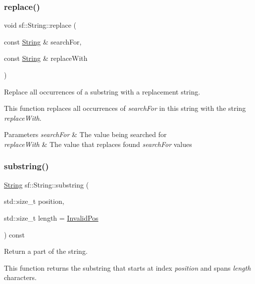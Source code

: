 \subsubsection{\texorpdfstring{replace()}{replace()}\hspace{0.1cm}{\footnotesize\ttfamily [2/2]}}
{\footnotesize\ttfamily void sf\+::\+String\+::replace (\begin{DoxyParamCaption}\item[{const \hyperlink{classsf_1_1_string}{String} \&}]{search\+For,  }\item[{const \hyperlink{classsf_1_1_string}{String} \&}]{replace\+With }\end{DoxyParamCaption})}



Replace all occurrences of a substring with a replacement string. 

This function replaces all occurrences of {\itshape search\+For} in this string with the string {\itshape replace\+With}.


\begin{DoxyParams}{Parameters}
{\em search\+For} & The value being searched for \\
\hline
{\em replace\+With} & The value that replaces found {\itshape search\+For} values \\
\hline
\end{DoxyParams}
\mbox{\label{classsf_1_1_string_a492645e00032455e6d92ff0e992654ce}} 
\subsubsection{\texorpdfstring{substring()}{substring()}}
{\footnotesize\ttfamily \hyperlink{classsf_1_1_string}{String} sf\+::\+String\+::substring (\begin{DoxyParamCaption}\item[{std\+::size\+\_\+t}]{position,  }\item[{std\+::size\+\_\+t}]{length = {\ttfamily \hyperlink{classsf_1_1_string_abaadecaf12a6b41c54d725c75fd28527}{Invalid\+Pos}} }\end{DoxyParamCaption}) const}



Return a part of the string. 

This function returns the substring that starts at index {\itshape position} and spans {\itshape length} characters.


